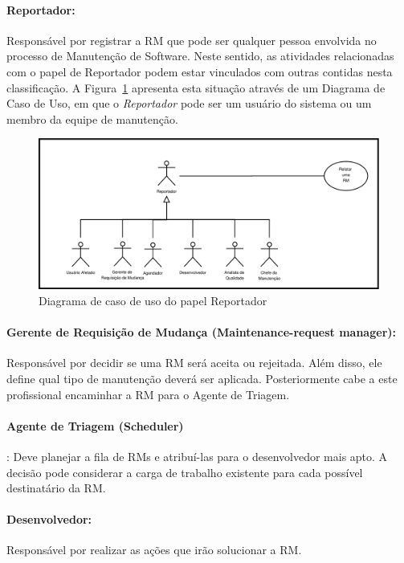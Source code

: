 \paragraph{Reportador:}
Responsável por registrar a RM que pode ser qualquer pessoa envolvida no
processo de Manutenção de Software. Neste sentido, as atividades relacionadas
com o papel de Reportador podem estar vinculados com outras contidas nesta
classificação. A Figura~\ref{fig:diagrama-caso-uso-reportador} apresenta esta
situação através de um Diagrama de Caso de Uso, em que o \textit{Reportador} pode
ser um usuário do sistema ou um membro da equipe de manutenção.

\begin{figure}[htpb]
	\centering
	\includegraphics[width=0.8\linewidth]{./chapter-manutencao-software-visao-geral/img/diagrama-caso-uso-reportador.pdf}
	\caption{Diagrama de caso de uso do papel Reportador}
\label{fig:diagrama-caso-uso-reportador}
\end{figure}

\paragraph{Gerente de Requisição de Mudança (Maintenance-request manager):}
Res\-pon\-sá\-vel por decidir se uma RM será aceita ou rejeitada. Além disso,
ele define qual tipo de manutenção deverá ser aplicada. Posteriormente cabe a
este profissional encaminhar a RM para o Agente de Triagem.

\paragraph{Agente de Triagem (Scheduler)}:
Deve planejar a fila de RMs e atribuí-las para o desenvolvedor mais apto. A
decisão pode considerar a carga de trabalho existente para cada possível
destinatário da RM\@.

\paragraph{Desenvolvedor:}
Responsável por realizar as ações que irão solucionar a RM\@.

